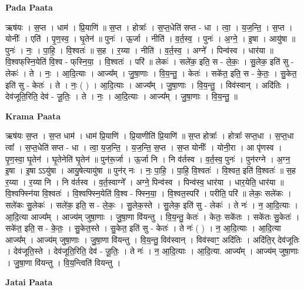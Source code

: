 \documentclass[17pt]{extarticle}
\begin{document}
\textbf{Pada Paata} \newline

ऋष॑यः । स॒प्त । धाम॑ । प्रि॒याणि॑ ॥ स॒प्त । होत्राः᳚ । स॒प्त॒धेति॑ सप्त - धा । त्वा॒ । य॒ज॒न्ति॒ । स॒प्त । योनीः᳚ । एति॑ । पृ॒ण॒स्व॒ । घृ॒तेन॑ ॥ पुनः॑ । ऊ॒र्जा । नीति॑ । व॒र्त॒स्व॒ । पुनः॑ । अ॒ग्ने॒ । इ॒षा । आयु॑षा ॥ पुनः॑ । नः॒ । पा॒हि॒ । वि॒श्वतः॑ ॥ स॒ह । र॒य्या । नीति॑ । व॒र्त॒स्व॒ । अग्ने᳚ । पिन्व॑स्व । धार॑या ॥ वि॒श्वफ्‌स्नि॒येति॑ वि॒श्व - फ्‌स्नि॒या॒ । वि॒श्वतः॑ । परि॑ ॥ लेकः॑ । सले॑क॒ इति॒ स - ले॒कः॒ । सु॒लेक॒ इति॑ सु - लेकः॑ । ते । नः॒ । आ॒दि॒त्याः । आज्य᳚म् । जु॒षा॒णाः । वि॒य॒न्तु॒ । केतः॑ । सके॑त॒ इति॒ स - के॒तः॒ । सु॒केत॒ इति॑ सु - केतः॑ । ते । नः॒ ( ) । आ॒दि॒त्याः । आज्य᳚म् । जु॒षा॒णाः । वि॒य॒न्तु॒ । विव॑स्वान् । अदि॑तिः । देव॑जूति॒रिति॒ देव॑ - जू॒तिः॒ । ते । नः॒ । आ॒दि॒त्याः । आज्य᳚म् । जु॒षा॒णाः । वि॒य॒न्तु॒ ॥  \newline


\textbf{Krama Paata} \newline

ऋष॑यः स॒प्त । स॒प्त धाम॑ । धाम॑ प्रि॒याणि॑ । प्रि॒याणीति॑ प्रि॒याणि॑ ॥ स॒प्त होत्राः᳚ । होत्राः᳚ सप्त॒धा । स॒प्त॒धा त्वा᳚ । स॒प्त॒धेति॑ सप्त - धा । त्वा॒ य॒ज॒न्ति॒ । य॒ज॒न्ति॒ स॒प्त । स॒प्त योनीः᳚ । योनी॒रा । आ पृ॑णस्व । पृ॒ण॒स्वा॒ घृ॒तेन॑ । घृ॒तेनेति॑ घृ॒तेन॑ ॥ पुन॑रू॒र्जा । ऊ॒र्जा नि । नि व॑र्तस्व । व॒र्त॒स्व॒ पुनः॑ । पुन॑रग्ने । अ॒ग्न॒ इ॒षा । इ॒षा ऽऽयु॑षा । आयु॒षेत्यायु॑षा ॥ पुन॑र् नः । नः॒ पा॒हि॒ । पा॒हि॒ वि॒श्वतः॑ । वि॒श्वत॒ इति॑ वि॒श्वतः॑ ॥ स॒ह र॒य्या । र॒य्या नि । नि व॑र्तस्व । व॒र्त॒स्वाग्ने᳚ । अग्ने॒ पिन्व॑स्व । पिन्व॑स्व॒ धार॑या । धार॒येति॒ धार॑या ॥ वि॒श्वफ्स्नि॑या वि॒श्वतः॑ । वि॒श्वफ्स्नि॒येति॑ वि॒श्व - फ्स्नि॒या॒ । वि॒श्वत॒स्परि॑ । परीति॒ परि॑ ॥ लेकः॒ सले॑कः । सले॑कः सु॒लेकः॑ । सले॑क॒ इति॒ स - ले॒कः॒ । सु॒लेक॒स्ते । सु॒लेक॒ इति॑ सु - लेकः॑ । ते नः॑ । न॒ आ॒दि॒त्याः । आ॒दि॒त्या आज्य᳚म् । आज्य॑म् जुषा॒णाः । जु॒षा॒णा वि॑यन्तु । वि॒य॒न्तु॒ केतः॑ । केतः॒ सके॑तः । सके॑तः सु॒केतः॑ । सके॑त॒ इति॒ स - के॒तः॒ । सु॒केत॒स्ते । सु॒केत॒ इति॑ सु - केतः॑ । ते नः॑ ( ) । न॒ आ॒दि॒त्याः । आ॒दि॒त्या आज्य᳚म् । आज्य॑म् जुषा॒णाः । जु॒षा॒णा वि॑यन्तु । वि॒य॒न्तु॒ विव॑स्वान् । विव॑स्वाꣳ॒॒ अदि॑तिः । अदि॑ति॒र् देव॑जूतिः । देव॑जूति॒स्ते । देव॑जूति॒रिति॒ देव॑ - जू॒तिः॒ । ते नः॑ । न॒ आ॒दि॒त्याः । आ॒दि॒त्या. आज्य᳚म् । आज्य॑म् जुषा॒णाः । जु॒षा॒णा वि॑यन्तु । वि॒य॒न्त्विति॑ वियन्तु । \newline

\textbf{Jatai Paata} \newline
\end{document}
